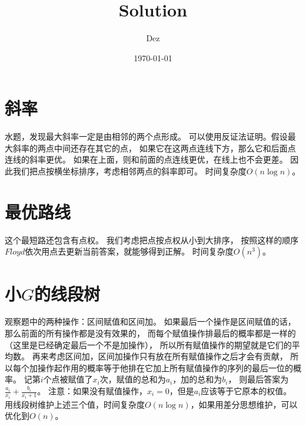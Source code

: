 \documentclass{article}
\title{Solution}
\author{Dez}
\date{\today}
\begin{document}
\maketitle

\section{斜率}
水题，发现最大斜率一定是由相邻的两个点形成。
可以使用反证法证明。假设最大斜率的两点中间还存在其它的点，
如果它在这两点连线下方，那么它和后面点连线的斜率更优。
如果在上面，则和前面的点连线更优，在线上也不会更差。
因此我们把点按横坐标排序，考虑相邻两点的斜率即可。
时间复杂度$O(n\log n)$。

\section{最优路线}
这个最短路还包含有点权。
我们考虑把点按点权从小到大排序，
按照这样的顺序$Floyd$依次用点去更新当前答案，就能够得到正解。
时间复杂度$O(n^3)$。

\section{小$G$的线段树}
观察题中的两种操作：区间赋值和区间加。
如果最后一个操作是区间赋值的话，那么前面的所有操作都是没有效果的，
而每个赋值操作排最后的概率都是一样的（这里是已经确定最后一个不是加操作），
所以所有赋值操作的期望就是它们的平均数。
再来考虑区间加，区间加操作只有放在所有赋值操作之后才会有贡献，
所以每个加操作起作用的概率等于他排在它加上所有赋值操作的序列的最后一位的概率。
记第$i$个点被赋值了$x_i$次，赋值的总和为$a_i$，加的总和为$b_i$，
则最后答案为$\frac{a_i}{x_i}+\frac{b_i}{x_i+1}$。
注意：如果没有赋值操作，$x_i=0$，但是$a_i$应该等于它原本的权值。
用线段树维护上述三个值，时间复杂度$O(n\log n)$，如果用差分思想维护，可以优化到$O(n)$。
\end{document}
